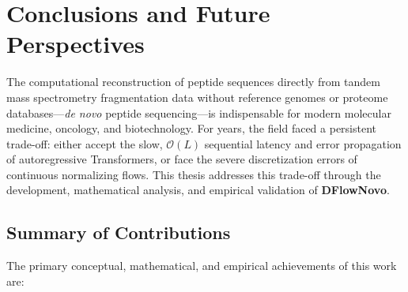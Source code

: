 \chapter{Conclusions and Future Perspectives}

The computational reconstruction of peptide sequences directly from tandem mass spectrometry fragmentation data without reference genomes or proteome databases---\emph{de novo} peptide sequencing---is indispensable for modern molecular medicine, oncology, and biotechnology. For years, the field faced a persistent trade-off: either accept the slow, $\mathcal{O}(L)$ sequential latency and error propagation of autoregressive Transformers, or face the severe discretization errors of continuous normalizing flows. This thesis addresses this trade-off through the development, mathematical analysis, and empirical validation of \textbf{DFlowNovo}.

\section{Summary of Contributions}

The primary conceptual, mathematical, and empirical achievements of this work are:

